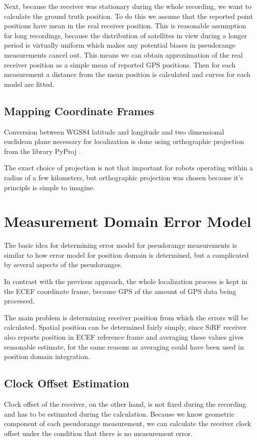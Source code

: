 Next, because the receiver was stationary during the whole recording, we want to
calculate the ground truth position.
To do this we assume that the reported point positions have mean in the real receiver position.
This is reasonable assumption for long recordings,
because the distribution of satellites in view during a longer period is
virtually uniform which makes any potential biases in pseudorange measurements
cancel out.
This means we can obtain approximation of the real receiver position as a simple
mean of reported GPS positions.
Then for each measurement a distance from the mean position is calculated and
curves for each model are fitted.

\subsection{Mapping Coordinate Frames}
\label{sec:impl-coordinates}
Conversion between WGS84 latitude and longitude and two dimensional euclidean
plane necessary for localization is done using orthographic projection from
the library PyProj \cite{www-pyproj}.

The exact choice of projection is not that important for robots operating within
a radius of a few kilometers, but orthographic projection was chosen because
it's principle is simple to imagine.

\section{Measurement Domain Error Model}
The basic idea for determining error model for pseudorange measurements is
similar to how error model for position domain is determined, but a complicated
by several aspects of the pseudoranges.

In contrast with the previous approach, the whole localization process is kept in
the ECEF coordinate frame, because GPS of the amount of GPS data being processed.

The main problem is determining receiver position from which the errors will be
calculated.
Spatial position can be determined fairly simply, since SiRF receiver also
reports position in ECEF reference frame and averaging these values gives
reasonable estimate, for the same reasons as averaging could have been used in
position domain integration.

\subsection{Clock Offset Estimation}
Clock offset of the receiver, on the other hand, is not fixed during the recording
and has to be estimated during the calculation.
Because we know geometric component of each pseudorange measurement, we can
calculate the receiver clock offset under the condition that there is no measurement
error.

